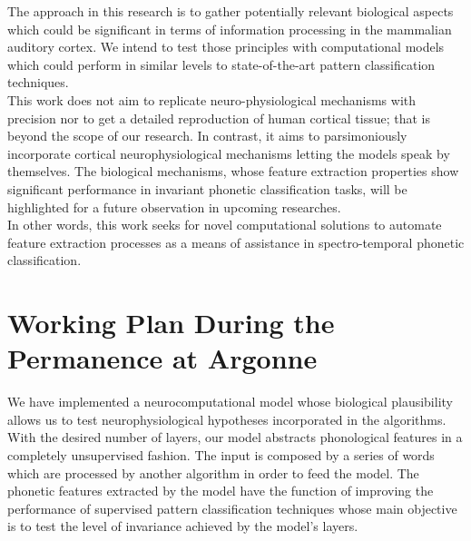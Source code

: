 \documentclass[11pt,a4paper]{article}
\begin{document}
The approach in this research is to gather
potentially relevant biological aspects which could be
significant in terms of information processing
in the mammalian auditory cortex. We intend to test those principles
with computational models which could
perform in similar levels to state-of-the-art pattern classification techniques. \\

This work does not aim to replicate 
neuro-physiological mechanisms with precision nor to get a detailed reproduction
of human cortical tissue; that is beyond the scope of our research. 
In contrast, it aims to parsimoniously incorporate cortical
neurophysiological mechanisms letting the models
speak by themselves.
The biological mechanisms, whose feature extraction
properties show significant performance
in invariant phonetic classification tasks, will be
highlighted for a future observation in upcoming researches. \\

In other words, this work seeks for novel computational solutions
to automate feature extraction processes as a means
of assistance in spectro-temporal phonetic classification. \\




















\section{Working Plan During the Permanence at Argonne}

We have implemented a neurocomputational model whose biological plausibility
allows us to test neurophysiological hypotheses incorporated in the algorithms.
With the desired number of layers, our model abstracts phonological features
in a completely unsupervised fashion.
The input is composed by a series of words which are processed by another algorithm
in order to feed the model.
The phonetic features extracted by the model have the function of improving
the performance of supervised pattern classification techniques
whose main objective is to test the level of invariance achieved by the model's layers. \\
\end{document}
